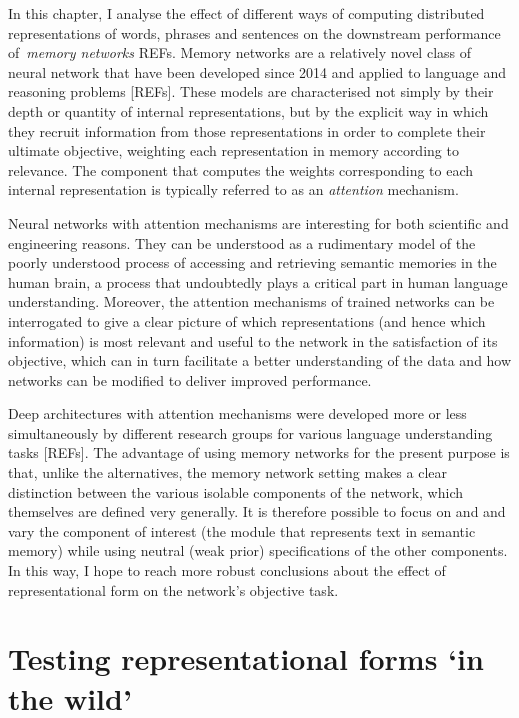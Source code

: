 \label{CH6}

In this chapter, I analyse the effect of different ways of computing distributed representations of words, phrases and sentences on the downstream performance of~\emph{memory networks} REFs. Memory networks are a relatively novel class of neural network that have been developed since 2014 and applied to language and reasoning problems [REFs]. These models are characterised not simply by their depth or quantity of internal representations, but by the explicit way in which they recruit information from those representations in order to complete their ultimate objective, weighting each representation in memory according to relevance. The component that computes the weights corresponding to each internal representation is typically referred to as an \emph{attention} mechanism. 

Neural networks with attention mechanisms are interesting for both scientific and engineering reasons. They can be understood as a rudimentary model of the poorly understood process of accessing and retrieving semantic memories in the human brain, a process that undoubtedly plays a critical part in human language understanding. Moreover, the attention mechanisms of trained networks can be interrogated to give a clear picture of which representations (and hence which information) is most relevant and useful to the network in the satisfaction of its objective, which can in turn facilitate a better understanding of the data and how networks can be modified to deliver improved performance.  

Deep architectures with attention mechanisms were developed more or less simultaneously by different research groups for various language understanding tasks [REFs]. The advantage of using memory networks for the present purpose is that, unlike the alternatives, the memory network setting makes a clear distinction between the various isolable components of the network, which themselves are defined very generally. It is therefore possible to focus on and and vary the component of interest (the module that represents text in semantic memory) while using neutral (weak prior) specifications of the other components. In this way, I hope to reach more robust conclusions about the effect of representational form on the network's objective task.  

\section{Testing representational forms `in the wild'}

